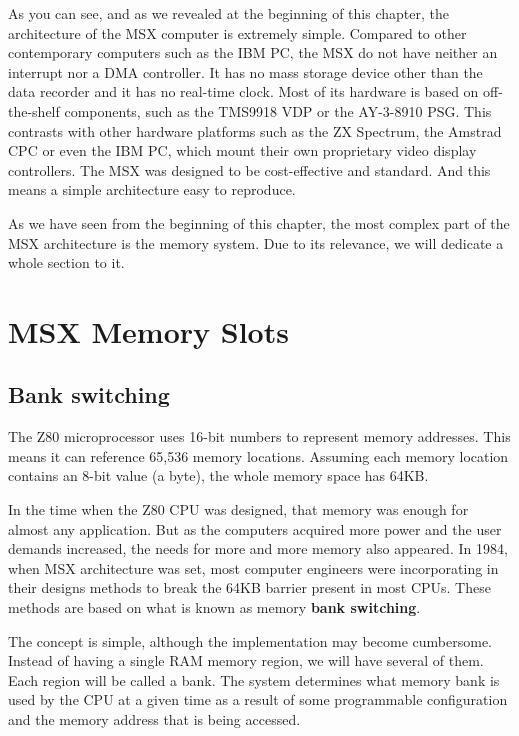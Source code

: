 As you can see, and as we revealed at the beginning of this chapter, the architecture of the MSX computer is extremely simple. Compared to other contemporary computers such as the IBM PC, the MSX do not have neither an interrupt nor a DMA controller. It has no mass storage device other than the data recorder and it has no real-time clock. Most of its hardware is based on off-the-shelf components, such as the TMS9918 VDP or the AY-3-8910 PSG. This contrasts with other hardware platforms such as the ZX Spectrum, the Amstrad CPC or even the IBM PC, which mount their own proprietary video display controllers. The MSX was designed to be cost-effective and standard. And this means a simple architecture easy to reproduce. 

As we have seen from the beginning of this chapter, the most complex part of the MSX architecture is the memory system. Due to its relevance, we will dedicate a whole section to it.

\section{MSX Memory Slots}
\label{sec:msx-mem-slots}

\subsection{Bank switching}

The Z80 microprocessor uses 16-bit numbers to represent memory addresses. This means it can reference 65,536 memory locations. Assuming each memory location contains an 8-bit value (a byte), the whole memory space has 64KB.

In the time when the Z80 CPU was designed, that memory was enough for almost any application. But as the computers acquired more power and the user demands increased, the needs for more and more memory also appeared. In 1984, when MSX architecture was set, most computer engineers were incorporating in their designs methods to break the 64KB barrier present in most CPUs. These methods are based on what is known as memory {\bf bank switching}. 

The concept is simple, although the implementation may become cumbersome. Instead of having a single RAM memory region, we will have several of them. Each region will be called a bank. The system determines what memory bank is used by the CPU at a given time as a result of some programmable configuration and the memory address that is being accessed. 

